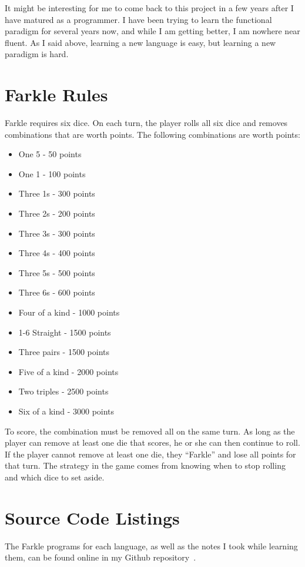 \documentclass{article}
\begin{document}
It might be interesting for me to come back to this project in a few years
after I have matured as a programmer.  I have been trying to learn the
functional paradigm for several years now, and while I am getting better, I am
nowhere near fluent.  As I said above, learning a new language is easy, but
learning a new paradigm is hard.




\appendix
\section{Farkle Rules}
\label{sec:farklerules}

Farkle requires six dice.  On each turn, the player rolls all six dice and
removes combinations that are worth points.  The following combinations are
worth points:

\begin{itemize}
\item One 5 - 50 points
\item One 1 - 100 points
\item Three 1s - 300 points
\item Three 2s - 200 points
\item Three 3s - 300 points
\item Three 4s - 400 points
\item Three 5s - 500 points
\item Three 6s - 600 points
\item Four of a kind - 1000 points
\item 1-6 Straight   - 1500 points
\item Three pairs    - 1500 points
\item Five of a kind - 2000 points
\item Two triples    - 2500 points
\item Six of a kind  - 3000 points
\end{itemize}

To score, the combination must be removed all on the same turn.  As long as the
player can remove at least one die that scores, he or she can then continue to roll.
If the player cannot remove at least one die, they ``Farkle'' and lose all
points for that turn.  The strategy in the game comes from knowing when to stop
rolling and which dice to set aside.

\section{Source Code Listings}
The Farkle programs for each language, as well as the notes I took while learning them, can be found online in my Github repository~\cite{mygithub}.
\end{document}

